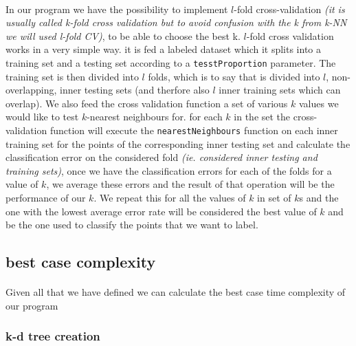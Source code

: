 \documentclass[11 pt]{article}
\begin{document}
\paragraph{}In our program we have the possibility to implement $l$-fold cross-validation \emph{(it is usually called k-fold cross validation but to avoid confusion with the k from k-NN we will used l-fold CV)}, to be able to choose the best k. $l$-fold cross validation works in a very simple way. it is fed a labeled dataset which it splits into a training set and a testing set according to a \texttt{tesstProportion} parameter. The training set is then divided into $l$ folds, which is to say that is divided into $l$, non-overlapping, inner testing sets (and therfore also $l$ inner training sets which can overlap). We also feed the cross validation function a set of various $k$ values we would like to test $k$-nearest neighbours for. for each $k$ in the set the cross-validation function will execute the \texttt{nearestNeighbours} function on each inner training set for the points of the corresponding inner testing set and calculate the classification error on the considered fold \emph{(ie. considered inner testing and training sets)}, once we have the classification errors for each of the folds for a value of $k$, we average these errors and the result of that operation will be the performance of our $k$. We repeat this for all the values of $k$ in set of $k$s and the one with the lowest average error rate will be considered the best value of $k$ and be the one used to classify the points that we want to label.
\subsection{best case complexity}
\paragraph{}Given all that we have defined we can calculate the best case time complexity of our program
\subsubsection{k-d tree creation}
\end{document}
